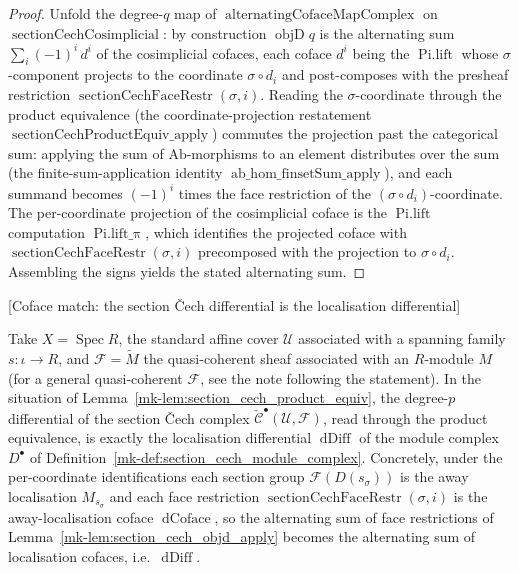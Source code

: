 \begin{proof}
  Unfold the degree-\(q\) map of \(\operatorname{alternatingCofaceMapComplex}\) on
  \(\operatorname{sectionCechCosimplicial}\): by construction \(\operatorname{objD} q\)
  is the alternating sum \(\sum_{i} (-1)^i\, d^i\) of the cosimplicial cofaces, each
  coface \(d^i\) being the \(\operatorname{Pi.lift}\) whose \(\sigma\)-component
  projects to the coordinate \(\sigma \circ d_i\) and post-composes with the presheaf
  restriction \(\operatorname{sectionCechFaceRestr}(\sigma, i)\). Reading the
  \(\sigma\)-coordinate through the product equivalence (the coordinate-projection
  restatement \(\operatorname{sectionCechProductEquiv\_apply}\)) commutes the projection
  past the categorical sum: applying the sum of \(\mathrm{Ab}\)-morphisms to an element
  distributes over the sum (the finite-sum-application identity
  \(\operatorname{ab\_hom\_finsetSum\_apply}\)), and each summand becomes
  \((-1)^i\) times the face restriction of the \((\sigma \circ d_i)\)-coordinate. The
  per-coordinate projection of the cosimplicial coface is the \(\operatorname{Pi.lift}\)
  computation \(\operatorname{Pi.lift\_π}\), which identifies the projected coface with
  \(\operatorname{sectionCechFaceRestr}(\sigma, i)\) precomposed with the projection to
  \(\sigma \circ d_i\). Assembling the signs yields the stated alternating sum.
\end{proof}

\begin{lemma}

[Coface match: the section {\v C}ech differential is the localisation differential]
  \label{mk-lem:section_cech_coface_match}

  Take \(X = \operatorname{Spec} R\), the standard affine cover \(\mathcal{U}\)
  associated with a spanning family \(s : \iota \to R\), and \(\mathcal{F} =
  \widetilde{M}\) the quasi-coherent sheaf associated with an \(R\)-module \(M\)
  (for a general quasi-coherent \(\mathcal{F}\), see the note following the statement). In
  the situation of Lemma~\ref{mk-lem:section_cech_product_equiv}, the degree-\(p\)
  differential of the section {\v C}ech complex
  \(\check{\mathcal{C}}^\bullet(\mathcal{U}, \mathcal{F})\), read through the product
  equivalence, is exactly the localisation differential \(\operatorname{dDiff}\) of the
  module complex \(D^\bullet\) of Definition~\ref{mk-def:section_cech_module_complex}.
  Concretely, under the per-coordinate identifications each section group
  \(\mathcal{F}(D(s_\sigma))\) is the away localisation \(M_{s_\sigma}\) and each face
  restriction \(\operatorname{sectionCechFaceRestr}(\sigma, i)\) is the away-localisation
  coface \(\operatorname{dCoface}\), so the alternating sum of face restrictions of
  Lemma~\ref{mk-lem:section_cech_objd_apply} becomes the alternating sum of localisation
  cofaces, i.e.\ \(\operatorname{dDiff}\).
\end{lemma}

